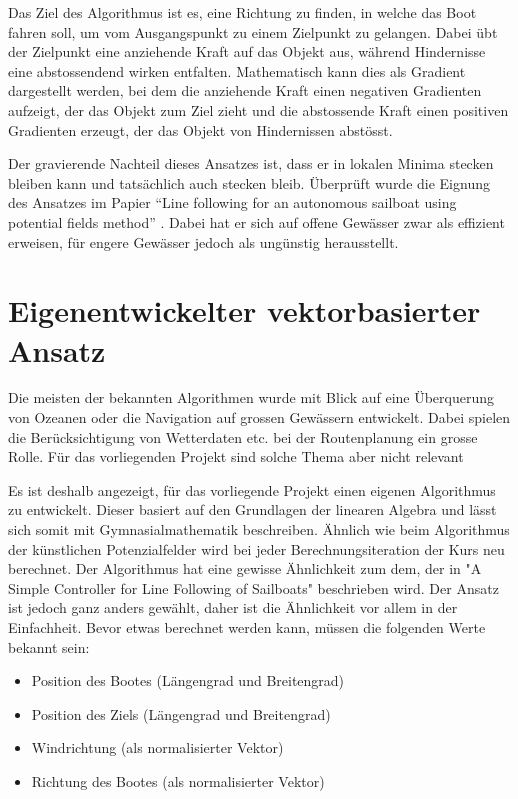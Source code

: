 Das Ziel des Algorithmus ist es, eine Richtung zu finden, in welche das Boot fahren soll, um vom Ausgangspunkt zu einem Zielpunkt zu gelangen. Dabei übt der Zielpunkt eine anziehende Kraft auf das Objekt aus, während Hindernisse eine abstossendend wirken entfalten. Mathematisch kann dies als Gradient dargestellt werden, bei dem die anziehende Kraft einen negativen Gradienten aufzeigt, der das Objekt zum Ziel zieht und die abstossende Kraft einen positiven Gradienten erzeugt, der das Objekt von Hindernissen abstösst.

Der gravierende Nachteil dieses Ansatzes ist, dass er in lokalen Minima stecken bleiben kann und tatsächlich auch stecken bleib. Überprüft wurde die Eignung des Ansatzes im Papier \enquote{Line following for an autonomous sailboat using potential ﬁelds method} \cite{inproceedings} . Dabei hat er sich auf offene Gewässer zwar als effizient erweisen, für engere Gewässer jedoch als ungünstig herausstellt.
\section{Eigenentwickelter vektorbasierter Ansatz}
Die meisten der bekannten Algorithmen wurde mit Blick auf eine Überquerung von Ozeanen oder die Navigation auf grossen Gewässern entwickelt. Dabei spielen die Berücksichtigung von Wetterdaten etc. bei der Routenplanung ein grosse Rolle. Für das vorliegenden Projekt sind solche Thema aber nicht relevant 

Es ist deshalb angezeigt, für das vorliegende Projekt einen eigenen Algorithmus zu entwickelt. Dieser basiert auf den Grundlagen der linearen Algebra und lässt sich somit mit Gymnasialmathematik beschreiben. Ähnlich wie beim Algorithmus der künstlichen Potenzialfelder wird bei jeder Berechnungsiteration der Kurs neu berechnet.  Der Algorithmus hat eine gewisse Ähnlichkeit zum dem, der in "A Simple Controller for Line Following of Sailboats" beschrieben wird. \cite{inproceedings}
Der Ansatz ist jedoch ganz anders gewählt, daher ist die Ähnlichkeit vor allem in der Einfachheit.
Bevor etwas berechnet werden kann, müssen die folgenden Werte bekannt sein:
\begin{itemize}
    \item Position des Bootes (Längengrad und Breitengrad)
    \item Position des Ziels (Längengrad und Breitengrad)
    \item Windrichtung (als normalisierter Vektor)
    \item Richtung des Bootes (als normalisierter Vektor)
    
\end{itemize}

